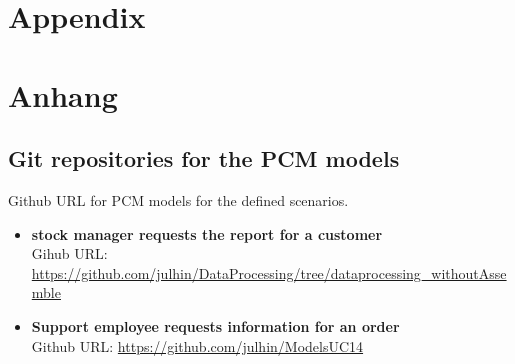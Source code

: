 

{\chapter{Appendix}}    %
{\chapter{Anhang}}      %
\label{chap:appendix}


\section{Git repositories for the PCM models}
\label{sec:appendix:FirstSection}
Github URL for PCM models for the defined scenarios.
\begin{itemize}
\item \textbf{stock manager requests the report for a customer}\\
Gihub URL: \url{https://github.com/julhin/DataProcessing/tree/dataprocessing_withoutAssemble}
\item \textbf{Support employee requests information for an order}\\
Github URL: \url{https://github.com/julhin/ModelsUC14}
\end{itemize}
		
